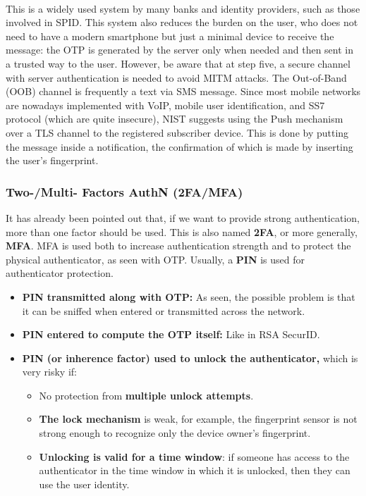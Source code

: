 \paragraph{}
This is a widely used system by many banks and identity providers, such as those involved in SPID. This system also reduces the burden on the user, who does not need to have a modern smartphone but just a minimal device to receive the message: the OTP is generated by the server only when needed and then sent in a trusted way to the user. However, be aware that at step five, a secure channel with server authentication is needed to avoid MITM attacks. The Out-of-Band (OOB) channel is frequently a text via SMS message. Since most mobile networks are nowadays implemented with VoIP, mobile user identification, and SS7 protocol (which are quite insecure), NIST suggests using the Push mechanism over a TLS channel to the registered subscriber device. This is done by putting the message inside a notification, the confirmation of which is made by inserting the user's fingerprint.


\subsubsection{Two-/Multi- Factors AuthN (2FA/MFA)}
It has already been pointed out that, if we want to provide strong authentication, more than one factor should be used. This is also named \textbf{2FA}, or more generally, \textbf{MFA}. MFA is used both to increase authentication strength and to protect the physical authenticator, as seen with OTP. Usually, a \textbf{PIN} is used for authenticator protection.
\begin{itemize}
  \item \textbf{PIN transmitted along with OTP:} As seen, the possible problem is that it can be sniffed when entered or transmitted across the network.
  \item \textbf{PIN entered to compute the OTP itself:} Like in RSA SecurID.
  \item \textbf{PIN (or inherence factor) used to unlock the authenticator,} which is very risky if:
        \begin{itemize}
          \item No protection from \textbf{multiple unlock attempts}.
          \item \textbf{The lock mechanism} is weak, for example, the fingerprint sensor is not strong enough to recognize only the device owner's fingerprint.
          \item \textbf{Unlocking is valid for a time window}: if someone has access to the authenticator in the time window in which it is unlocked, then they can use the user identity.
        \end{itemize}
\end{itemize}

